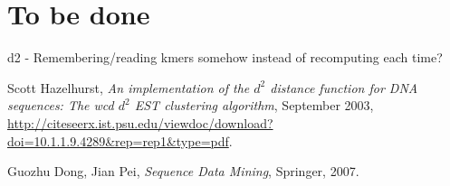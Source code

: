 \documentclass[11pt,a4paper]{article}
\begin{document}
\section{To be done}
d2 - Remembering/reading kmers somehow instead of recomputing each time?






\newpage
\begin{thebibliography}{9}
    Scott Hazelhurst,
    \emph{An implementation of the $d^2$ distance function for DNA
      sequences: The wcd $d^2$ EST clustering algorithm},
      September 2003,
      \url{http://citeseerx.ist.psu.edu/viewdoc/download?doi=10.1.1.9.4289&rep=rep1&type=pdf}.

      Guozhu Dong, Jian Pei, \emph{Sequence Data Mining},
      Springer, 2007.
\end{thebibliography}
\end{document}
